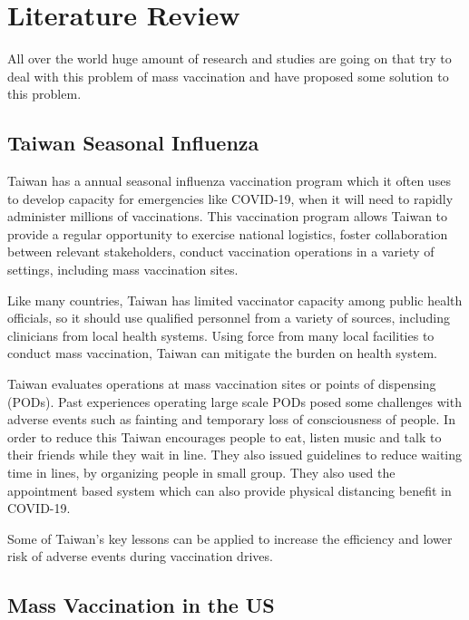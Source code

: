\documentclass[10pt,twocolumn,letterpaper]{article}
\begin{document}
\section{Literature Review}

All over the world huge amount of research and studies are going on that try to deal with this problem of mass vaccination and have proposed some solution to this problem.

\subsection{Taiwan Seasonal Influenza}

Taiwan has a annual seasonal influenza vaccination program which it often uses to develop capacity for emergencies like COVID-19, when it will need to rapidly administer millions of vaccinations. This vaccination program allows Taiwan to provide a regular opportunity to exercise national logistics,  foster collaboration between relevant stakeholders, conduct vaccination operations in a variety of settings, including mass vaccination sites.~\cite{Alpher05}

Like many countries, Taiwan has limited vaccinator capacity among public health officials, so it should use qualified personnel from a variety of sources, including clinicians from local health systems. Using force from many local facilities to conduct mass vaccination, Taiwan can mitigate the burden on health system.~\cite{Alpher05} 

Taiwan evaluates operations at mass vaccination sites or points of dispensing (PODs). Past experiences operating large scale PODs posed some challenges with adverse events such as fainting and temporary loss of consciousness of people. In order to reduce this Taiwan encourages people to eat, listen music and talk to their friends while they wait in line. They also issued guidelines to reduce waiting time in lines, by organizing people in small group. They also used the appointment based system which can also provide physical distancing benefit in COVID-19.~\cite{Alpher05}

Some of Taiwan's key lessons can be applied to increase the efficiency and lower risk of adverse events during vaccination drives.

\subsection{Mass Vaccination in the US}
\end{document}
